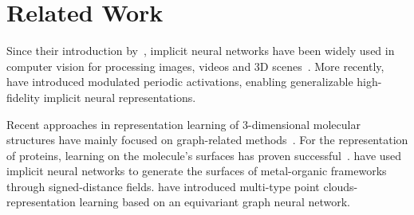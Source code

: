 \section{Related Work}
Since their introduction by~\citet{sitzmannImplicitNeuralRepresentations2020}, implicit neural networks have been widely used in computer vision for processing images, videos and 3D scenes~\citep{essakineWhereWeStand2024}. More recently,~\citet{mehtaModulatedPeriodicActivations2021} have introduced modulated periodic activations, enabling generalizable high-fidelity implicit neural representations. 

Recent approaches in representation learning of 3-dimensional molecular structures have mainly focused on graph-related methods~\citep{zhouUniMolUniversal3D2022,moon3DGraphContrastive2023}. For the representation of proteins, learning on the molecule's surfaces has proven successful~\citep{gainzaDecipheringInteractionFingerprints2020}. \citep{gainzaDecipheringInteractionFingerprints2020} have used implicit neural networks to generate the surfaces of metal-organic frameworks through signed-distance fields. \citep{kilgourMultiTypePointCloud2024} have introduced multi-type point clouds-representation learning based on an equivariant graph neural network.